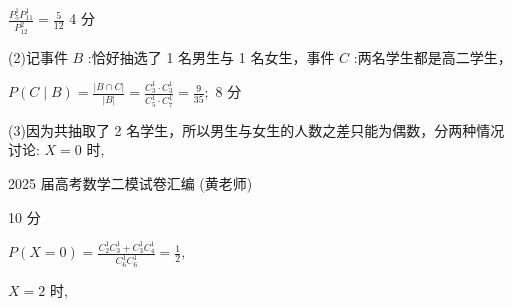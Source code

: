 \documentclass[10pt]{article}
\begin{document}
\(\frac{{P}_{5}^{1}{P}_{11}^{1}}{{P}_{12}^{2}} = \frac{5}{12}\) 4 分

(2)记事件 \(B\) :恰好抽选了 1 名男生与 1 名女生，事件 \(C\) :两名学生都是高二学生，

\(P\left( {C \mid  B}\right)  = \frac{\left| B \cap  C\right| }{\left| B\right| } = \frac{{C}_{3}^{1} \cdot  {C}_{3}^{1}}{{C}_{5}^{1} \cdot  {C}_{7}^{1}} = \frac{9}{35};\) 8 分

(3)因为共抽取了 2 名学生，所以男生与女生的人数之差只能为偶数，分两种情况讨论: \(X = 0\) 时,

2025 届高考数学二模试卷汇编 (黄老师)

\begin{center}
\end{center}

\begin{center}
\end{center}

10 分

\(P\left( {X = 0}\right)  = \frac{{C}_{2}^{1}{C}_{3}^{1} + {C}_{3}^{1}{C}_{4}^{1}}{{C}_{6}^{1}{C}_{6}^{1}} = \frac{1}{2},\)

\(X = 2\) 时,

\begin{center}
\end{center}

\begin{center}
\end{center}
\end{document}

